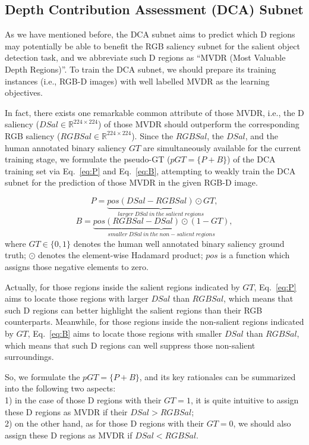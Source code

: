 \documentclass[journal]{IEEEtran}
\begin{document}
\subsection{Depth Contribution Assessment (DCA) Subnet}
\label{sec:DQSN}
As we have mentioned before, the DCA subnet aims to predict which D regions may potentially be able to benefit the RGB saliency subnet for the salient object detection task, and we abbreviate such D regions as ``MVDR (Most Valuable Depth Regions)''.
To train the DCA subnet, we should prepare its training instances (i.e., RGB-D images) with well labelled MVDR as the learning objectives.

In fact, there exists one remarkable common attribute of those MVDR, i.e., the D saliency ($DSal\in\mathbb{R}^{224\times 224}$) of those MVDR should outperform the corresponding RGB saliency ($RGBSal\in\mathbb{R}^{224\times 224}$).
Since the $RGBSal$, the $DSal$, and the human annotated binary saliency $GT$ are simultaneously available for the current training stage, we formulate the pseudo-GT ($pGT=\{P+B\}$) of the DCA training set via Eq.~\ref{eq:P} and Eq.~\ref{eq:B}, attempting to weakly train the DCA subnet for the prediction of those MVDR in the given RGB-D image.

\begin{equation}
\label{eq:P}
{P} = \underset{larger\ DSal\ in \ the\ salient \ regions}{\underbrace{pos(DSal-RGBSal)\odot GT}},
\end{equation}
\begin{equation}
\label{eq:B}
{B} = \underset{smaller\ DSal\ in \ the\ non-salient \ regions}{\underbrace{pos(RGBSal-DSal)\odot (1-GT)}},
\end{equation}
where $GT\in\{0,1\}$ denotes the human well annotated binary saliency ground truth; $\odot$ denotes the element-wise Hadamard product; $pos$ is a function which assigns those negative elements to zero.

Actually, for those regions inside the salient regions indicated by $GT$, Eq.~\ref{eq:P} aims to locate those regions with larger $DSal$ than $RGBSal$, which means that such D regions can better highlight the salient regions than their RGB counterparts.
Meanwhile, for those regions inside the non-salient regions indicated by $GT$, Eq.~\ref{eq:B} aims to locate those regions with smaller $DSal$ than $RGBSal$, which means that such D regions can well suppress those non-salient surroundings.

So, we formulate the $pGT=\{P+B\}$, and its key rationales can be summarized into the following two aspects:\\
1) in the case of those D regions with their $GT=1$, it is quite intuitive to assign these D regions as MVDR if their $DSal>RGBSal$;\\
2) on the other hand, as for those D regions with their $GT=0$, we should also assign these D regions as MVDR if $DSal<RGBSal$.
\end{document}
